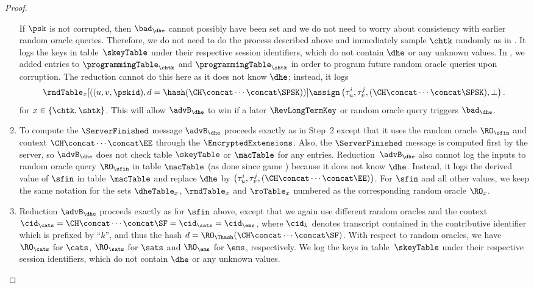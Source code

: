 \begin{proof}
\begin{enumerate}
		If $\psk$ is not corrupted, then $\bad_{\dhe}$ cannot possibly have been set and we do not need to worry about consistency with earlier random oracle queries.
		Therefore, we do not need to do the process described above and immediately sample $\chtk$  randomly as in \thisGame.
		It logs the keys in table~$\skeyTable$ under their respective session identifiers, which do not contain $\dhe$ or any unknown values.
		In \thisGame, we added entries to $\programmingTable_{\chtk}$ and $\programmingTable_{\shtk}$ in order to program future random oracle queries upon corruption.
		The reduction cannot do this here as it does not know $\dhe$; instead, it logs
		\[
			\rndTable_x[((u, v, \pskid), d = \hash(\CH \concat \dotsb \concat \SPSK) )] \assign \left(  \tau_u^i, \tau_v^j, (\CH \concat \dotsb \concat \SPSK), \bot \right).
		\]
		for $x \in \{\chtk, \shtk\}$.
		This will allow $\advB_\dhe$ to win if a later $\RevLongTermKey$ or random oracle query triggers $\bad_{\dhe}$.
%		
		\item To compute the $\ServerFinished$ message $\advB_\dhe$ proceeds exactly as in Step~2 except that it uses the random oracle $\RO_{\sfin}$ and context $\CH \concat \dotsb \concat \EE$ through the $\EncryptedExtensions$. 
		Also, the $\ServerFinished$ message is computed first by the server, so $\advB_\dhe$ does not check table $\skeyTable$ or $\macTable$ for any entries.
		Reduction~$\advB_\dhe$ also cannot log the inputs to random oracle query $\RO_{\sfin}$ in table $\macTable$ (as done since game ) because it does not know $\dhe$.
		Instead, it logs the derived value of $\sfin$ in table~$\macTable$ and replace $\dhe$  by $\left(  \tau_u^i, \tau_v^j, (\CH \concat \dotsb \concat \EE) \right)$.
		For $\sfin$ and all other values, we keep the same notation for the sets $\dheTable_x$, $\rndTable_x$ and $\roTable_x$ numbered as the corresponding random oracle $\RO_x$.
%		
		\item Reduction $\advB_\dhe$ proceeds exactly as for $\sfin$ above,
		except that we again use different random oracles and the context $\cid_\cats = \CH \concat \dotsb \concat \SF = \cid_\sats = \cid_\ems$, where $\cid_k$ denotes transcript contained in the contributive identifier which is prefixed by ``$k$'', and thus the hash $d = \RO_\Thash(\CH \concat \dotsb \concat \SF)$.
		With respect to random oracles, we have $\RO_{\cats}$ for $\cats$, $\RO_{\sats}$ for $\sats$ and $\RO_{\ems}$ for $\ems$, respectively.
		We log the keys in table~$\skeyTable$ under their respective session identifiers, which do not contain $\dhe$ or any unknown values.
		

\end{enumerate}
\end{proof}
